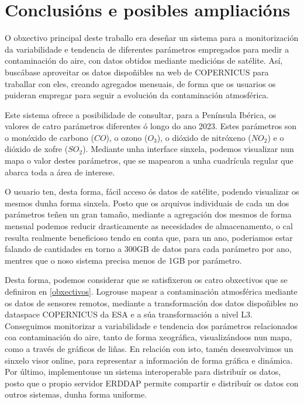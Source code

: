 \chapter{Conclusións e posibles ampliacións}
O obxectivo principal deste traballo era deseñar un sistema para a monitorización da variabilidade e tendencia de diferentes parámetros empregados para medir a contaminación do aire, con datos
obtidos mediante medicións de satélite. Así, buscábase aproveitar os datos dispoñibles na web de COPERNICUS para traballar con eles, creando agregados mensuais, de forma que os usuarios os puideran
empregar para seguir a evolución da contaminación atmosférica.

Este sistema ofrece a posibilidade de consultar, para a Península Ibérica, os valores de catro parámetros diferentes ó longo do ano 2023. Estes parámetros son o monóxido de carbono ($CO$), o ozono
($O_3$), o dióxido de nitróxeno ($NO_2$) e o dióxido de xofre ($SO_2$). Mediante unha interface sinxela, podemos visualizar nun mapa o valor destes parámetros, que se mapearon a unha cuadrícula
regular que abarca toda a área de interese.

O usuario ten, desta forma, fácil acceso ós datos de satélite, podendo visualizar os mesmos dunha forma sinxela. Posto que os arquivos individuais de cada un dos parámetros teñen un gran tamaño,
mediante a agregación dos mesmos de forma mensual podemos reducir drasticamente as necesidades de almacenamento, o cal resulta realmente beneficioso tendo en conta que, para un ano, poderiamos
estar falando de cantidades en torno a 300GB de datos para cada parámetro por ano, mentres que o noso sistema precisa menos de 1GB por parámetro.

Desta forma, podemos considerar que se satisfixeron os catro obxectivos que se definiron en \ref{obxectivos}. Logrouse mapear a contaminación atmosférica mediante os datos de sensores remotos,
mediante a transformación dos datos dispoñibles no dataspace COPERNICUS da ESA e a súa transformación a nivel L3. Conseguimos monitorizar a variabilidade e tendencia dos parámetros relacionados coa
contaminación do aire, tanto de forma xeográfica, visualizándoos nun mapa, como a través de gráficos de liñas. En relación con isto, tamén desenvolvimos un sinxelo visor online, para representar a
información de forma gráfica e dinámica. Por último, implementouse un sistema interoperable para distribuír os datos, posto que o propio servidor ERDDAP permite compartir e distribuír os datos con
outros sistemas, dunha forma uniforme.

